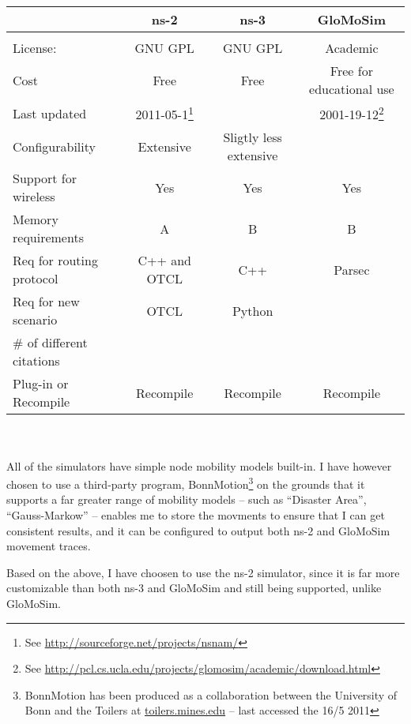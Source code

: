 \begin{minipage}{15.0cm}
\begin{tabular}[4]{l|c|c|c}
                          & ns-2      & ns-3    & GloMoSim  \\
\hline\\
License:                  & GNU GPL   & GNU GPL & Academic  \\
Cost                      & Free      & Free    & Free for educational use \\
Last updated              & 2011-05-1\footnote{See \url{http://sourceforge.net/projects/nsnam/}} & & 2001-19-12\footnote{See \url{http://pcl.cs.ucla.edu/projects/glomosim/academic/download.html}}\\
Configurability           & Extensive & Sligtly less extensive \\
Support for wireless      & Yes       & Yes    &Yes \\
Memory requirements       & A & B & B \\
Req for routing protocol  & C++ and OTCL & C++ & Parsec \\
Req for new scenario      & OTCL      & Python  & \\
\# of different citations & & &\\
Plug-in or Recompile      & Recompile & Recompile  & Recompile
\end{tabular}
\end{minipage}\\\\

All of the simulators have simple node mobility models built-in. I have however chosen to use a third-party program, BonnMotion\footnote{BonnMotion has been produced as a collaboration between the University of Bonn and the Toilers at \url{toilers.mines.edu} -- last accessed the 16/5 2011} on the grounds that it supports a far greater range of mobility models -- such as ``Disaster Area'', ``Gauss-Markow'' -- enables me to store the movments to ensure that I can get consistent results, and it can be configured to output both ns-2 and GloMoSim movement traces.

Based on the above, I have choosen to use the ns-2 simulator, since it is far more customizable than both ns-3 and GloMoSim and still being supported, unlike GloMoSim.
